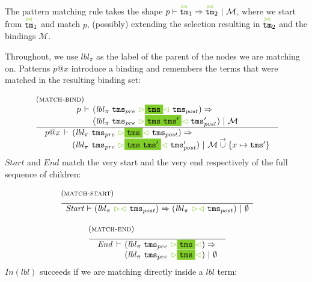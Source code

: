 \documentclass{article}
\makeatletter
\newcommand{\rulename}{\textsc}
\newcommand{\irule}[3]{\begin{array}{l}{~\small\mbox{(\rulename{#1})}}\\\;\frac{\begin{array}{c}#2\end{array}}{\begin{array}{l}#3\end{array}}\end{array}}
\newcommand{\cursorColor}{LimeGreen}
\newcommand{\lbl}{\ensuremath{\mathit{lbl}}}
\newcommand{\tm}{\ensuremath{\mathtt{tm}}}
\newcommand{\tms}{\ensuremath{\mathtt{tms}}}
\newcommand{\Tmc}{\ensuremath{\overset{ \textcolor{\cursorColor}{\bowtie}}{\tm}}}
\newcommand{\mstart}{\ensuremath{\textcolor{\cursorColor}{\rhd}}}
\newcommand{\mend}{\ensuremath{\textcolor{\cursorColor}{\lhd}}}
\newcommand{\bindings}{\ensuremath{\mathcal{M}}}
\newcommand{\nobindings}{\ensuremath{\emptyset}}
\newcommand{\extend}[2]{\ensuremath{#1\overset{\rightarrow}{\cup}#2}}
\newcommand{\select}[1]{\mstart\colorbox{\cursorColor}{$#1$}\mend}
\newcommand{\matches}[4]{\ensuremath{#1 \vdash #2 \Rightarrow #3 ~|~ #4}}
\newcommand{\xmatches}[4]{\ensuremath{
    \begin{array}{r@{\hspace{4pt}}c@{\hspace{4pt}}l}%
      #1 & \vdash & #2 \Rightarrow\\
         &        & #3 ~|~ #4
    \end{array}}}
\newcommand{\pseq}[2]{\ensuremath{#1 \cdot #2}}
\newcommand{\children}[2]{\ensuremath{#1} \Downarrow #2}
\newcommand{\maybe}[1]{\ensuremath{#1?}}
\newcommand{\many}[1]{\ensuremath{#1^*}}
\newcommand{\bind}[2]{\ensuremath{#1@#2}}
\newcommand{\paction}[2]{\ensuremath{#1\mathop{\circ} #2}}
\newcommand{\pin}[1]{\ensuremath{\mathit{In}(#1)}}
\newcommand{\pstart}{\ensuremath{\mathit{Start}}}
\newcommand{\pend}{\ensuremath{\mathit{End}}}
\makeatother
\begin{document}
\[\begin{array}{rcl}
  \end{array}
\]
%
The pattern matching rule takes the shape
$\matches{p}{\Tmc_1}{\Tmc_2}{\bindings}$, where we start from
$\Tmc_1$ and match $p$, (possibly) extending the selection
resulting in $\Tmc_2$ and the bindings $\bindings$.

Throughout, we use $\lbl_\pi$ as the label of the parent of the
nodes we are matching on.
%
Patterns $\bind{p}{x}$ introduce a binding and remembers the terms
that were matched in the resulting binding set:

\[
  \begin{array}{c}
    \irule{match-bind}{
    \xmatches{p}{(\lbl_\pi~\tms_{pre}~\select{\tms}~\tms_{post})}
                {(\lbl_\pi~\tms_{pre}~\select{\tms~\tms'}~\tms'_{post})}{\bindings}
    }{
    \xmatches{\bind{p}{x}}
    {(\lbl_\pi~\tms_{pre}~\select{\tms}~\tms_{post})}
    {(\lbl_\pi~\tms_{pre}~\select{\tms~\tms'}~\tms'_{post})}{\extend{\bindings}{\{x\mapsto \tms'\}}}
    }
  \end{array}
\]
%
\pstart{} and \pend{} match the very start and the very end
respectively of the full sequence of children:

\[
  \begin{array}{c}
    \irule{match-start}{}{
    \matches{\pstart}
    {(\lbl_\pi~\mstart\mend~\tms_{post})}
    {(\lbl_\pi~\mstart\mend~\tms_{post})}{\nobindings}
    }
    \\\\
    \irule{match-end}{}{
    \xmatches{\pend}
    {(\lbl_\pi~\tms_{pre}~\select{\tms})}
    {(\lbl_\pi~\tms_{pre}~\select{\tms})}{\nobindings}
    }
  \end{array}
\]
%
$\pin{\lbl}$ succeeds if we are matching directly inside a $\lbl$
term:
\end{document}
